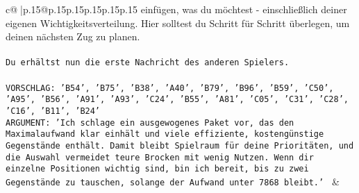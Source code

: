 \documentclass{article}
\begin{document}
{\begin{supertabular}{c@{$\;$}|p{.15\linewidth}@{}p{.15\linewidth}p{.15\linewidth}p{.15\linewidth}p{.15\linewidth}p{.15\linewidth}}
{{{einfügen, was du möchtest - einschließlich deiner eigenen Wichtigkeitsverteilung. Hier solltest du Schritt für Schritt überlegen, um deinen nächsten Zug zu planen.\\ \tt \\ \tt Du erhältst nun die erste Nachricht des anderen Spielers.\\ \tt \\ \tt VORSCHLAG: {'B54', 'B75', 'B38', 'A40', 'B79', 'B96', 'B59', 'C50', 'A95', 'B56', 'A91', 'A93', 'C24', 'B55', 'A81', 'C05', 'C31', 'C28', 'C16', 'B11', 'B24'}\\ \tt ARGUMENT: {'Ich schlage ein ausgewogenes Paket vor, das den Maximalaufwand klar einhält und viele effiziente, kostengünstige Gegenstände enthält. Damit bleibt Spielraum für deine Prioritäten, und die Auswahl vermeidet teure Brocken mit wenig Nutzen. Wenn dir einzelne Positionen wichtig sind, bin ich bereit, bis zu zwei Gegenstände zu tauschen, solange der Aufwand unter 7868 bleibt.'} 
	  } 
	   } 
	   } 
	 & \\ 
 

    \theutterance {}  


\end{supertabular}}
\end{document}
